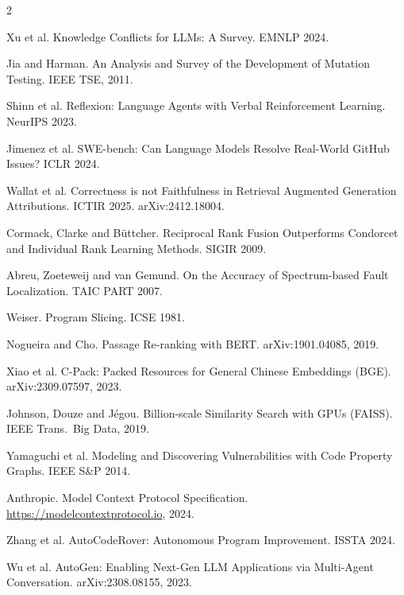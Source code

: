 \documentclass[10pt,a4paper]{article}
\begin{document}
\begin{multicols}{2}
\begin{enumerate}[label={[\arabic*]},leftmargin=*,itemsep=1pt]
\item Xu et al. Knowledge Conflicts for LLMs: A Survey. EMNLP 2024.
\item Jia and Harman. An Analysis and Survey of the Development of Mutation Testing. IEEE TSE, 2011.
\item Shinn et al. Reflexion: Language Agents with Verbal Reinforcement Learning. NeurIPS 2023.
\item Jimenez et al. SWE-bench: Can Language Models Resolve Real-World GitHub Issues? ICLR 2024.
\item Wallat et al. Correctness is not Faithfulness in Retrieval Augmented Generation Attributions. ICTIR 2025. arXiv:2412.18004.
\item Cormack, Clarke and B\"uttcher. Reciprocal Rank Fusion Outperforms Condorcet and Individual Rank Learning Methods. SIGIR 2009.
\item Abreu, Zoeteweij and van Gemund. On the Accuracy of Spectrum-based Fault Localization. TAIC PART 2007.
\item Weiser. Program Slicing. ICSE 1981.
\item Nogueira and Cho. Passage Re-ranking with BERT. arXiv:1901.04085, 2019.
\item Xiao et al. C-Pack: Packed Resources for General Chinese Embeddings (BGE). arXiv:2309.07597, 2023.
\item Johnson, Douze and J\'egou. Billion-scale Similarity Search with GPUs (FAISS). IEEE Trans.\ Big Data, 2019.
\item Yamaguchi et al. Modeling and Discovering Vulnerabilities with Code Property Graphs. IEEE S\&P 2014.
\item Anthropic. Model Context Protocol Specification. \url{https://modelcontextprotocol.io}, 2024.
\item Zhang et al. AutoCodeRover: Autonomous Program Improvement. ISSTA 2024.
\item Wu et al. AutoGen: Enabling Next-Gen LLM Applications via Multi-Agent Conversation. arXiv:2308.08155, 2023.
\end{enumerate}
\end{multicols}
\end{document}
